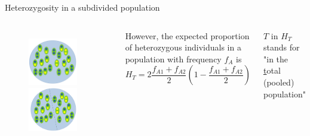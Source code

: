 \begin{frame}{Heterozygosity in a subdivided population}

        \begin{columns}


                \begin{figure}
			\includegraphics[width=0.8\textwidth]{Pics/predivision} \
                        \includegraphics[width=0.8\textwidth]{Pics/division}
                \end{figure}


                However, the expected proportion of heterozygous individuals in a population with frequency $f_A$ is
                \begin{equation}
                        H_T = 2 \frac{f_{A1} + f_{A2}}{2} (1 - \frac{f_{A1} + f_{A2}}{2})
                \end{equation}

                \bigskip

                \small{$T$ in $H_T$ stands for "in the \underline{t}otal (pooled) population"}
        
        \end{columns}

\end{frame}


